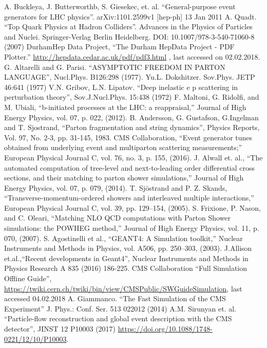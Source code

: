 \documentclass[print]{nuthesis}
\begin{document}
\begin{thebibliography}{300}
 A. Buckleya, J. Butterworthb, S. Giesekec, et. al. ``General-purpose event generators for LHC physics''. arXiv:1101.2599v1 [hep-ph] 13 Jan 2011
 A. Quadt. ``Top Quark Physics at Hadron Colliders''. Advances in the Physics of Particles and Nuclei. Springer-Verlag Berlin Heidelberg. DOI: 10.1007/978-3-540-71060-8 (2007)
 DurhamHep Data Project, ``The Durham HepData Project - PDF Plotter.'' \url{http://hepdata.cedar.ac.uk/pdf/pdf3.html} , last accessed on 02.02.2018.
 G. Altarelli and G. Parisi. ``ASYMPTOTIC FREEDOM IN PARTON LANGUAGE'', Nucl.Phys. B126:298 (1977).
 Yu.L. Dokshitzer. Sov.Phys. JETP 46:641 (1977)
 V.N. Gribov, L.N. Lipatov. ``Deep inelastic e p scattering in perturbation theory'', Sov.J.Nucl.Phys. 15:438 (1972)
F. Maltoni, G. Ridolfi, and M. Ubiali, ``b-initiated processes at the LHC: a reappraisal,'' Journal of High Energy Physics, vol. 07, p. 022, (2012).
B. Andersson, G. Gustafson, G.Ingelman and T. Sjostrand, ``Parton fragmentation and string dynamics'', Physics Reports, Vol. 97, No. 2-3, pp. 31-145, 1983.
CMS Collaboration, ``Event generator tunes obtained from underlying event and multiparton scattering measurements;'' European Physical Journal C, vol. 76, no. 3, p. 155, (2016).
 J. Alwall et. al., ``The automated computation of tree-level and next-to-leading order differential cross sections, and their matching to parton shower simulations,'' Journal of High Energy Physics, vol. 07, p. 079, (2014).
 T. Sjöstrand and P. Z. Skands, ``Transverse-momentum-ordered showers and interleaved multiple interactions,'' European Physical Journal C, vol. 39, pp. 129–154, (2005).
S. Frixione, P. Nason, and C. Oleari, ``Matching NLO QCD computations with Parton Shower simulations: the POWHEG method,'' Journal of High Energy Physics, vol. 11, p. 070, (2007).
 S. Agostinelli et al., ``GEANT4: A Simulation toolkit,'' Nuclear Instruments and Methods in Physics, vol. A506, pp. 250–303, (2003).
 J.Allison et.al.,``Recent developments in Geant4'', Nuclear Instruments and Methods in Physics Research A 835 (2016) 186-225.  
 CMS Collaboration ``Full Simulation Offline Guide'', \url{https://twiki.cern.ch/twiki/bin/view/CMSPublic/SWGuideSimulation}, last accessed 04.02.2018
 A. Giammanco. ``The Fast Simulation of the CMS Experiment'' J. Phys.: Conf. Ser. 513 022012 (2014) 
 A.M. Sirunyan et. al. ``Particle-flow reconstruction and global event description with the CMS detector'', JINST 12 P10003 (2017) \url{https://doi.org/10.1088/1748-0221/12/10/P10003}.

\end{thebibliography}
\end{document}
